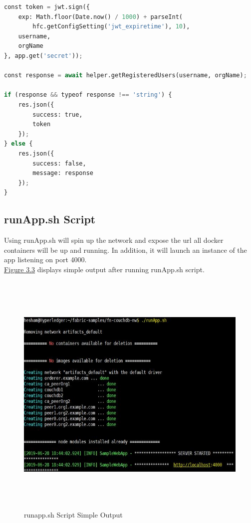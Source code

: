 \begin{lstlisting}[language=Python, caption=JWT Generation]
const token = jwt.sign({
    exp: Math.floor(Date.now() / 1000) + parseInt(
        hfc.getConfigSetting('jwt_expiretime'), 10),
    username,
    orgName
}, app.get('secret'));

const response = await helper.getRegisteredUsers(username, orgName);

if (response && typeof response !== 'string') {
    res.json({
        success: true,
        token
    });
} else {
    res.json({
        success: false,
        message: response
    });
}
\end{lstlisting}
\cleardoublepage


\subsection{runApp.sh Script }
Using runApp.sh will spin up the network and expose the url all docker containers will be up and running. In addition, it will launch an instance of the app listening on port 4000. \\
\hyperref[fig:runapp]{Figure 3.3} displays simple output after running runApp.sh script. 
\ \\
 \begin{figure}[H]
\includegraphics[width=15cm,height=12cm]{images/runapp.jpg}
\caption{runapp.sh Script Simple Output}
\label{fig:runapp}
\end{figure}


